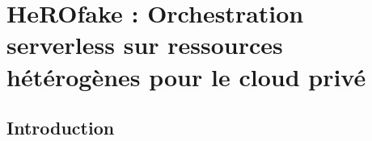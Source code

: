 \chapter{HeROfake : Orchestration serverless sur ressources hétérogènes pour le cloud privé}
\label{chapter:herofake}








\section{Introduction}
\label{section:herofake-introduction}

